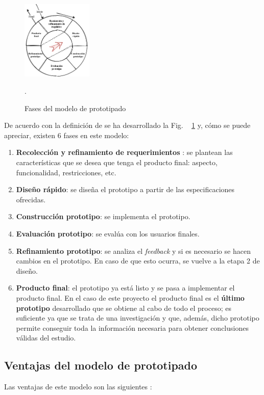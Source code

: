 \begin{figure}[h]
    \centering
    \includegraphics[width=0.3\textwidth]{cap3_analisis_tecnico/images/modelo_prototipado.png}
    \caption{Fases del modelo de prototipado}.
    \label{fig:modelo_prototipado}
\end{figure}

De acuerdo con la definición de \cite{modeloPrototipos1} se ha desarrollado la Fig. ~ \ref{fig:modelo_prototipado} y, cómo se puede apreciar, existen 6 fases en este modelo:

\begin{enumerate}
    \item \textbf{Recolección y refinamiento de requerimientos }: se plantean las características que se desea que tenga el producto final: aspecto, funcionalidad, restricciones, etc. 
    \item \textbf{Diseño rápido}: se diseña el prototipo a partir de las especificaciones ofrecidas.
    \item \textbf{Construcción prototipo}: se implementa el prototipo.
    \item \textbf{Evaluación prototipo}: se evalúa con los usuarios finales.
    \item \textbf{Refinamiento prototipo}: se analiza el \textit{feedback} y si es necesario se hacen cambios en el prototipo. En caso de que esto ocurra, se vuelve a la etapa 2 de diseño.
    \item \textbf{Producto final}: el prototipo ya está listo y se pasa a implementar el producto final. En el caso de este proyecto el producto final es el \textbf{último prototipo} desarrollado que se obtiene al cabo de todo el proceso; es suficiente ya que se trata de una investigación y que, además, dicho prototipo permite conseguir toda la información necesaria para obtener conclusiones válidas del estudio. 
\end{enumerate}



\subsection{Ventajas del modelo de prototipado}
Las ventajas de este modelo son las siguientes \cite{modeloPrototipos1, modeloPrototipos2, ventajasDesventajasPrototipos}: 

